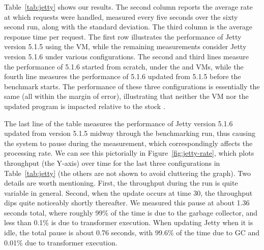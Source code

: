 Table~\ref{tab:jetty} shows our results.  The second column reports the
average rate at which requests were handled, measured every five
seconds over the 
sixty second run, along with the standard deviation.  The third column is
the average response time per request.  The first row
illustrates the performance of Jetty version 5.1.5 using the \DSU{} VM,
while the remaining measurements consider Jetty version 5.1.6 under various
configurations.  The second and third lines measure the performance of
5.1.6 started from scratch, under the \JikesRVM{} and \DSU{} VMs, while the
fourth line measures the performance of 5.1.6 updated from 5.1.5 before the
benchmark starts.  The performance of these three configurations is
essentially the same (all within the margin of error), illustrating that
neither the \DSU{} VM nor the updated program is impacted relative to the
stock \JikesRVM{}.

The last line of the table measures the performance of Jetty version 5.1.6 updated from
version 5.1.5 midway through the benchmarking run, thus causing the system to pause
during the measurement, which correspondingly affects the processing rate.
We can see this pictorially in Figure~\ref{fig:jetty-rate}, which plots
throughput (the Y-axis) over time for the last three configurations in
Table~\ref{tab:jetty} (the others are not shown to avoid cluttering
the graph).  Two details are worth mentioning.  First, the
throughput during the run is quite variable in general.  Second, when the
update occurs at time 30, the throughput dips quite noticeably shortly
thereafter.  We measured this pause at about 1.36 seconds total, where
roughly 99\% of the time is due to the garbage collector, and less than
0.1\% is due to transformer execution. When updating Jetty
when it is idle, the total pause is about 0.76 seconds, with 99.6\% of the
time due to GC and 0.01\% due to transformer execution.

% 


